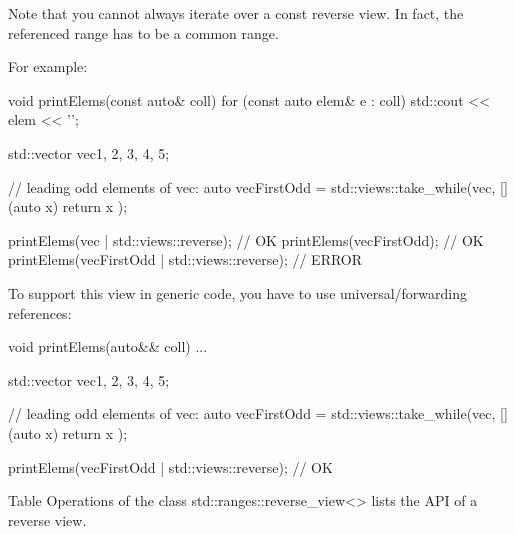 
Note that you cannot always iterate over a const reverse view. In fact, the referenced range has to be a common range.

For example:

\begin{cpp}
void printElems(const auto& coll) {
	for (const auto elem& e : coll) {
		std::cout << elem << '\n';
	}
}

std::vector vec{1, 2, 3, 4, 5};

// leading odd elements of vec:
auto vecFirstOdd = std::views::take_while(vec, [](auto x) {
						return x %
					});
					
printElems(vec | std::views::reverse); // OK
printElems(vecFirstOdd); // OK
printElems(vecFirstOdd | std::views::reverse); // ERROR
\end{cpp}

To support this view in generic code, you have to use universal/forwarding references:

\begin{cpp}
void printElems(auto&& coll) {
	...
}

std::vector vec{1, 2, 3, 4, 5};

// leading odd elements of vec:
auto vecFirstOdd = std::views::take_while(vec, [](auto x) {
							return x %
						});

printElems(vecFirstOdd | std::views::reverse); // OK
\end{cpp}



Table Operations of the class std::ranges::reverse\_view<> lists the API of a reverse view.

